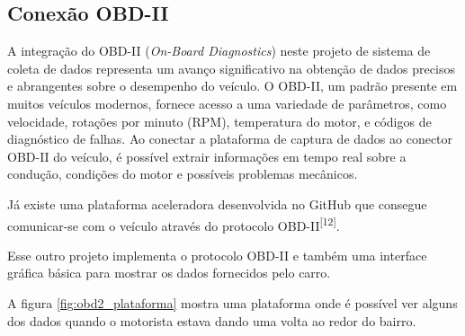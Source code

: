     \subsection{Conexão OBD-II}

    A integração do OBD-II (\textit{On-Board Diagnostics}) neste projeto de sistema de coleta de dados representa um avanço significativo na obtenção de dados precisos e abrangentes sobre o desempenho do veículo. O OBD-II, um padrão presente em muitos veículos modernos, fornece acesso a uma variedade de parâmetros, como velocidade, rotações por minuto (RPM), temperatura do motor, e códigos de diagnóstico de falhas. Ao conectar a plataforma de captura de dados ao conector OBD-II do veículo, é possível extrair informações em tempo real sobre a condução, condições do motor e possíveis problemas mecânicos.

    Já existe uma plataforma aceleradora desenvolvida no GitHub que consegue comunicar-se com o veículo através do protocolo OBD-II\textsuperscript{[12]}. 
    
    Esse outro projeto implementa o protocolo OBD-II e também uma interface gráfica básica para mostrar os dados fornecidos pelo carro.

    A figura \ref{fig:obd2_plataforma} mostra uma plataforma onde é possível ver alguns dos dados quando o motorista estava dando uma volta ao redor do bairro.

